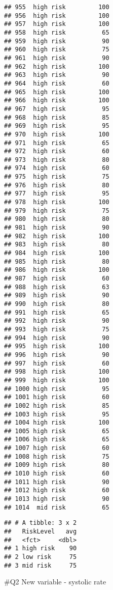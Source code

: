 \documentclass[
  ignorenonframetext,
]{beamer}
\begin{document}
\begin{frame}[fragile]
\begin{verbatim}
## 955  high risk         100
## 956  high risk         100
## 957  high risk         100
## 958  high risk          65
## 959  high risk          90
## 960  high risk          75
## 961  high risk          90
## 962  high risk         100
## 963  high risk          90
## 964  high risk          60
## 965  high risk         100
## 966  high risk         100
## 967  high risk          95
## 968  high risk          85
## 969  high risk          95
## 970  high risk         100
## 971  high risk          65
## 972  high risk          60
## 973  high risk          80
## 974  high risk          60
## 975  high risk          75
## 976  high risk          80
## 977  high risk          95
## 978  high risk         100
## 979  high risk          75
## 980  high risk          80
## 981  high risk          90
## 982  high risk         100
## 983  high risk          80
## 984  high risk         100
## 985  high risk          80
## 986  high risk         100
## 987  high risk          60
## 988  high risk          63
## 989  high risk          90
## 990  high risk          80
## 991  high risk          65
## 992  high risk          90
## 993  high risk          75
## 994  high risk          90
## 995  high risk         100
## 996  high risk          90
## 997  high risk          60
## 998  high risk         100
## 999  high risk         100
## 1000 high risk          95
## 1001 high risk          60
## 1002 high risk          85
## 1003 high risk          95
## 1004 high risk         100
## 1005 high risk          65
## 1006 high risk          65
## 1007 high risk          60
## 1008 high risk          75
## 1009 high risk          80
## 1010 high risk          60
## 1011 high risk          90
## 1012 high risk          60
## 1013 high risk          90
## 1014  mid risk          65
\end{verbatim}

\begin{verbatim}
## # A tibble: 3 x 2
##   RiskLevel   avg
##   <fct>     <dbl>
## 1 high risk    90
## 2 low risk     75
## 3 mid risk     75
\end{verbatim}

\#Q2 New variable - systolic rate


\end{frame}
\end{document}
